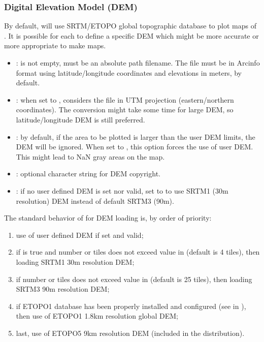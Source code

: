 \subsubsection{Digital Elevation Model (DEM)}

By default, \webobs will use SRTM/ETOPO global topographic database to plot maps of . It is possible for each  to define a specific DEM which might be more accurate or more appropriate to make maps.
\begin{itemize}

\item {}: is not empty, must be an absolute path filename. The file must be in Arcinfo format using latitude/longitude coordinates and elevations in meters, by default.

\item {}: when set to , considers the file in UTM projection (eastern/northern coordinates). The conversion might take some time for large DEM, so latitude/longitude DEM is still preferred.

\item {}: by default, if the area to be plotted is larger than the user DEM limits, the DEM will be ignored. When set to , this option forces the use of user DEM. This might lead to NaN gray areas on the map.

\item {}: optional character string for DEM copyright.

\item {}: if no user defined DEM is set nor valid, set to  to use SRTM1 (30m resolution) DEM instead of default SRTM3 (90m).

\end{itemize}

The standard behavior of \webobs for DEM loading is, by order of priority:
\begin{enumerate}

\item use of user defined DEM if set and valid;

\item if  is true and number or tiles does not exceed  value in  (default is 4 tiles), then loading SRTM1 30m resolution DEM;

\item if number or tiles does not exceed  value in  (default is 25 tiles), then loading SRTM3 90m resolution DEM;

\item if ETOPO1 database has been properly installed and configured (see  in ), then use of ETOPO1 1.8km resolution global DEM;

\item last, use of ETOPO5 9km resolution DEM (included in the \webobs distribution).

\end{enumerate}


